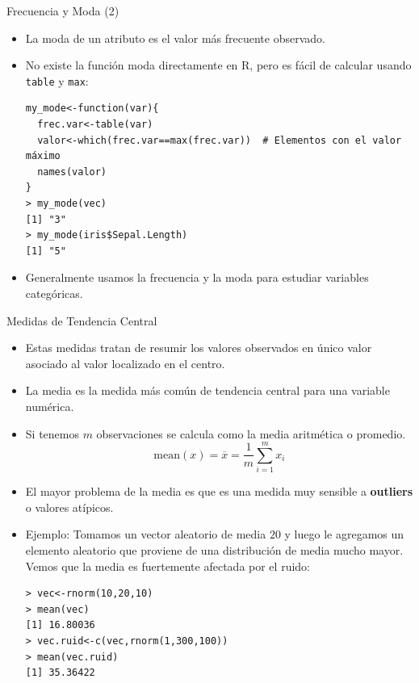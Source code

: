 \documentclass[handout]{beamer}
\begin{document}
\begin{frame}[fragile]{Frecuencia y Moda (2)}
\scriptsize{
\begin{itemize}
 \item La moda de un atributo es el valor más frecuente observado.
 \item No existe la función moda directamente en R, pero es fácil de calcular usando \verb+table+ y \verb+max+:
 \begin{verbatim}
my_mode<-function(var){
  frec.var<-table(var)
  valor<-which(frec.var==max(frec.var))  # Elementos con el valor máximo
  names(valor)
}
> my_mode(vec)
[1] "3"
> my_mode(iris$Sepal.Length)
[1] "5"
 \end{verbatim}
 
\item Generalmente usamos la frecuencia y la moda para estudiar variables categóricas.

\end{itemize}
 

 }
\end{frame}


\begin{frame}[fragile]{Medidas de Tendencia Central}
\scriptsize{
\begin{itemize}
 \item Estas medidas tratan de resumir los valores observados en único valor asociado al valor localizado en el centro.
 \item La media es la medida más común de tendencia central para una variable numérica. 
 \item Si tenemos $m$ observaciones se calcula como la media aritmética o promedio.
 \begin{displaymath}
   \text{mean}(x) = \overline{x} = \frac{1}{m} \sum_{i=1}^{m} x_i
 \end{displaymath}

 \item El mayor problema de la media es que es una medida muy sensible a \textbf{outliers} o valores atípicos.
 
 \item Ejemplo: Tomamos un vector aleatorio de media $20$ y luego le agregamos un elemento aleatorio que proviene de una distribución de media mucho mayor.  Vemos que la media es fuertemente afectada por el ruido:
 \begin{verbatim}
> vec<-rnorm(10,20,10)
> mean(vec)
[1] 16.80036
> vec.ruid<-c(vec,rnorm(1,300,100))
> mean(vec.ruid)
[1] 35.36422
 \end{verbatim}

 
\end{itemize}

 
}
 
\end{frame}
\end{document}
